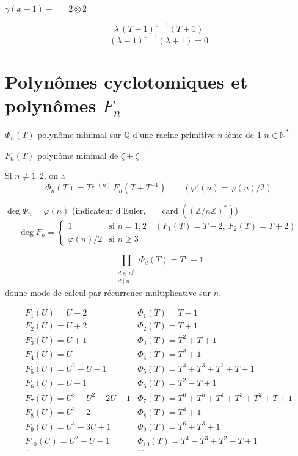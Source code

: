 \documentclass[11pt,a4paper]{article}
\begin{document}

$\gamma$\uncertain{$!$}$(x-1)+$\ill{} $= 2\otimes 2$ 

\[
\lambda\,(T-1)^{\nu-1}(T+1)
\]
\[
(\lambda-1)^{\nu-1}(\lambda+1) = 0
\]
 

\section{Polynômes cyclotomiques et polynômes $F_n$}

$\Phi_n(T)$ polynôme minimal sur $\mathbb{Q}$ d'une racine primitive $n$-ième de $1$ \qquad $n\in\mathbb{N}^*$

$F_n(T)$ polynôme minimal de $\zeta+\zeta^{-1}$

Si $n\neq 1,2$, on a
\[
\Phi_n(T) = T^{\varphi'(n)}\, F_n(T+T^{-1}) \qquad (\varphi'(n)=\varphi(n)/2)
\]

$\deg\Phi_n = \varphi(n)$ (indicateur d'Euler, $=\operatorname{card}((\mathbb{Z}/n\mathbb{Z})^*)$)
\[
\deg F_n = \begin{cases} 1 & \text{si } n=1,2 \quad (F_1(T)=T-2,\ F_2(T)=T+2)\\ \varphi(n)/2 & \text{si } n\geqslant 3\end{cases}
\]

\[
\prod_{\substack{d\in\mathbb{N}^*\\ d\mid n}} \Phi_d(T) = T^n-1
\]
donne mode de calcul par récurrence multiplicative sur $n$.

\[
\begin{array}{ll}
F_1(U) = U-2 & \Phi_1(T) = T-1\\
F_2(U) = U+2 & \Phi_2(T) = T+1\\
F_3(U) = U+1 & \Phi_3(T) = T^2+T+1\\
F_4(U) = U & \Phi_4(T) = T^2+1\\
F_5(U) = U^2+U-1 & \Phi_5(T) = T^4+T^3+T^2+T+1\\
F_6(U) = U-1 & \Phi_6(T) = T^2-T+1\\
F_7(U) = U^3+U^2-2U-1 & \Phi_7(T) = T^6+T^5+T^4+T^3+T^2+T+1\\
F_8(U) = U^2-2 & \Phi_8(T) = T^4+1\\
F_9(U) = U^3-3U+1 & \Phi_9(T) = T^6+T^3+1\\
F_{10}(U) = U^2-U-1 & \Phi_{10}(T) = T^4-T^3+T^2-T+1\\
\cdots & \cdots
\end{array}
\]
\end{document}
